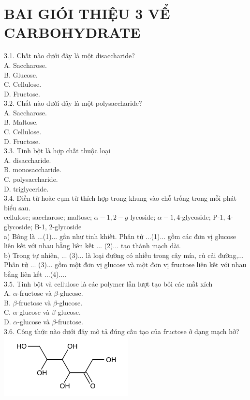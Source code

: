 \documentclass[10pt]{article}
\begin{document}
\section*{BAI GIÓI THIỆU 3 VỂ CARBOHYDRATE}
3.1. Chất nào dưới đây là một disaccharide?\\
A. Saccharose.\\
B. Glucose.\\
C. Cellulose.\\
D. Fructose.\\
3.2. Chất nào dưới đây là một polysaccharide?\\
A. Saccharose.\\
B. Maltose.\\
C. Cellulose.\\
D. Fructose.\\
3.3. Tinh bột là hợp chất thuộc loại\\
A. disaccharide.\\
B. monosaccharide.\\
C. polysaccharide.\\
D. triglyceride.\\
3.4. Điền từ hoăc cụm từ thích hợp trong khung vào chỗ trống trong mỗi phát biểu sau.\\
cellulose; saccharose; maltose; $\alpha-1,2-g$ lycoside; $\alpha-1,4$-glycoside; P-1, 4-glycoside; B-1, 2-glycoside\\
a) Bông là ...(1)... gần như tinh khiết. Phân tử ...(1)... gồm các đơn vị glucose liên kết với nhau bằng liên kết ... (2)... tạo thành mạch dài.\\
b) Trong tự nhiên, ... (3)... là loại đường có nhiều trong cây mía, củ cải đường,... Phân tử ... (3)... gồm một đơn vị glucose và một đơn vị fructose liên kết với nhau bằng liên kết ...(4)....\\
3.5. Tinh bột và cellulose là các polymer lần lượt tạo bỏi các mắt xích\\
A. $\alpha$-fructose và $\beta$-glucose.\\
B. $\beta$-fructose và $\beta$-glucose.\\
C. $\alpha$-glucose và $\beta$-glucose.\\
D. $\alpha$-glucose và $\beta$-fructose.\\
3.6. Công thức nào dưới đây mô tả đúng cấu tạo của fructose ở dạng mạch hở?\\
\includegraphics{smile-cbd802e308b52371710b858532258f8f3e5f00d4}
\end{document}
